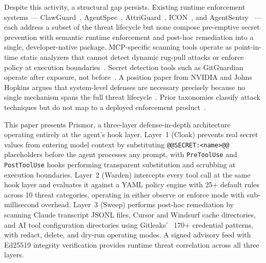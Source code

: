 \documentclass[11pt,letterpaper]{article}
\begin{document}
Despite this activity, a structural gap persists.
Existing runtime enforcement systems --- ClawGuard~\cite{zhao2026clawguard},
AgentSpec~\cite{wang2026agentspec}, AttriGuard~\cite{he2026attriguard},
ICON~\cite{wang2026icon}, and AgentSentry~\cite{authors2026agentsentry} --- each address
a subset of the threat lifecycle but none compose pre-emptive secret prevention
with semantic runtime enforcement and post-hoc remediation into a single,
developer-native package.
MCP-specific scanning tools operate as point-in-time static analyzers that
cannot detect dynamic rug-pull attacks or enforce policy at execution
boundaries~\cite{cosai2026mcp,invariantlabs2025mcp}.
Secret detection tools such as GitGuardian operate after exposure, not
before~\cite{gitguardian2026state}.
A position paper from NVIDIA and Johns Hopkins argues that system-level
defenses are necessary precisely because no single mechanism spans the full
threat lifecycle~\cite{research2026architecting}.
Prior taxonomies classify attack techniques but do not map to a deployed
enforcement product~\cite{kim2026attack,foundation2025owasp}.

This paper presents Prismor, a three-layer defense-in-depth architecture
operating entirely at the agent's hook layer.
Layer~1 (Cloak) prevents real secret values from entering model context by
substituting \texttt{@@SECRET:<name>@@} placeholders before the agent processes
any prompt, with \texttt{PreToolUse} and \texttt{PostToolUse} hooks performing
transparent substitution and scrubbing at execution boundaries.
Layer~2 (Warden) intercepts every tool call at the same hook layer and evaluates
it against a YAML policy engine with 25+ default rules across 10 threat
categories, operating in either observe or enforce mode with sub-millisecond
overhead.
Layer~3 (Sweep) performs post-hoc remediation by scanning Claude transcript
JSONL files, Cursor and Windsurf cache directories, and AI tool configuration
directories using Gitleaks'~\cite{rice2024gitleaks} 170+ credential patterns,
with redact, delete, and dry-run operating modes.
A signed advisory feed with Ed25519 integrity verification provides runtime
threat correlation across all three layers.
\end{document}
